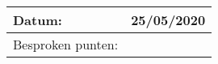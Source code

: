 \begin{tabularx}{\textwidth}{| l | X |}
  \hline
  Datum: & 25/05/2020\\
  \hline
  Besproken punten: &
  \begin{compactitem}
    \item \hl{}
    \item \hl{}
    \item \hl{}
  \end{compactitem}\\
  \hline
\end{tabularx}
